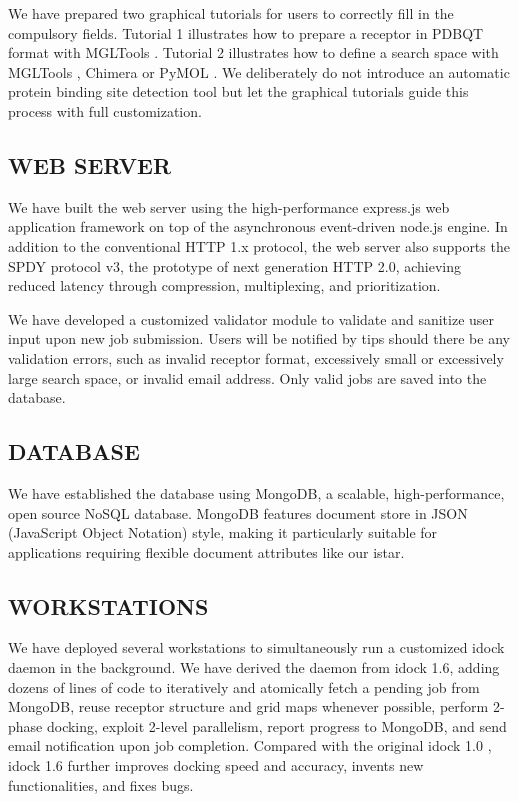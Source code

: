 \documentclass[12pt]{article}
\begin{document}
We have prepared two graphical tutorials for users to correctly fill in the compulsory fields. Tutorial 1 illustrates how to prepare a receptor in PDBQT format with MGLTools \citep{596}. Tutorial 2 illustrates how to define a search space with MGLTools \citep{596}, Chimera \citep{1219} or PyMOL \citep{1221}. We deliberately do not introduce an automatic protein binding site detection tool but let the graphical tutorials guide this process with full customization.

\subsection*{\sffamily \large WEB SERVER}

We have built the web server using the high-performance express.js web application framework on top of the asynchronous event-driven node.js engine. In addition to the conventional HTTP 1.x protocol, the web server also supports the SPDY protocol v3, the prototype of next generation HTTP 2.0, achieving reduced latency through compression, multiplexing, and prioritization.

We have developed a customized validator module to validate and sanitize user input upon new job submission. Users will be notified by tips should there be any validation errors, such as invalid receptor format, excessively small or excessively large search space, or invalid email address. Only valid jobs are saved into the database.

\subsection*{\sffamily \large DATABASE}

We have established the database using MongoDB, a scalable, high-performance, open source NoSQL database. MongoDB features document store in JSON (JavaScript Object Notation) style, making it particularly suitable for applications requiring flexible document attributes like our istar. 

\subsection*{\sffamily \large WORKSTATIONS}

We have deployed several workstations to simultaneously run a customized idock daemon in the background. We have derived the daemon from idock 1.6, adding dozens of lines of code to iteratively and atomically fetch a pending job from MongoDB, reuse receptor structure and grid maps whenever possible, perform 2-phase docking, exploit 2-level parallelism, report progress to MongoDB, and send email notification upon job completion. Compared with the original idock 1.0 \citep{1153}, idock 1.6 further improves docking speed and accuracy, invents new functionalities, and fixes bugs.
\end{document}
